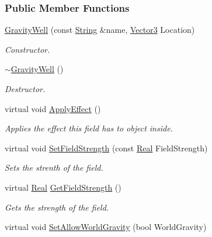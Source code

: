 \subsubsection*{Public Member Functions}
\begin{DoxyCompactItemize}
\item 
\hyperlink{classphys_1_1GravityWell_afa165244f8bde11f59e249b43da4973b}{GravityWell} (const \hyperlink{namespacephys_aa03900411993de7fbfec4789bc1d392e}{String} \&name, \hyperlink{classphys_1_1Vector3}{Vector3} Location)
\begin{DoxyCompactList}\small\item\em Constructor. \item\end{DoxyCompactList}\item 
\hyperlink{classphys_1_1GravityWell_aeeeb63ceb3feb1223f8339f73412777d}{$\sim$GravityWell} ()
\begin{DoxyCompactList}\small\item\em Destructor. \item\end{DoxyCompactList}\item 
virtual void \hyperlink{classphys_1_1GravityWell_a944817d495baf9f71b6d33a420eccfde}{ApplyEffect} ()
\begin{DoxyCompactList}\small\item\em Applies the effect this field has to object inside. \item\end{DoxyCompactList}\item 
virtual void \hyperlink{classphys_1_1GravityWell_ab4ead80191e25dc9cb017ffaab44602f}{SetFieldStrength} (const \hyperlink{namespacephys_af7eb897198d265b8e868f45240230d5f}{Real} FieldStrength)
\begin{DoxyCompactList}\small\item\em Sets the strenth of the field. \item\end{DoxyCompactList}\item 
virtual \hyperlink{namespacephys_af7eb897198d265b8e868f45240230d5f}{Real} \hyperlink{classphys_1_1GravityWell_afb006e895ec0465cc7d8ee85aff25776}{GetFieldStrength} ()
\begin{DoxyCompactList}\small\item\em Gets the strength of the field. \item\end{DoxyCompactList}\item 
virtual void \hyperlink{classphys_1_1GravityWell_a1dc68391835134835a9969ed823a0b81}{SetAllowWorldGravity} (bool WorldGravity)

\end{DoxyCompactItemize}
